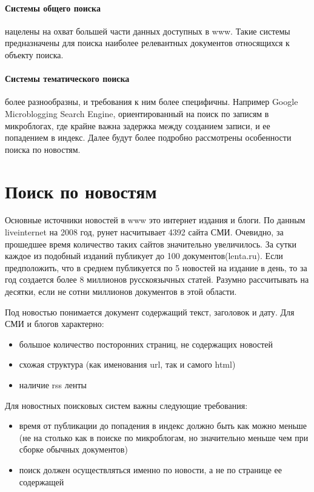 \paragraph{Системы общего поиска} нацелены на охват большей части данных доступных в www. Такие системы предназначены для поиска наиболее релевантных документов относящихся к объекту поиска.
\paragraph{Системы тематического поиска} более разнообразны, и требования к ним более специфичны. Например Google Microblogging Search Engine, ориентированный на поиск по записям в микроблогах, где крайне важна задержка между созданием записи, и ее попадением в индекс. Далее будут более подробно рассмотрены особенности поиска по новостям.

\section{Поиск по новостям}

Основные источники новостей в www это интернет издания и блоги. По данным liveinternet на 2008 год, рунет насчитывает 4392 сайта СМИ. Очевидно, за прошедшее время количество таких сайтов значительно увеличилось. За сутки каждое из подобный изданий публикует до 100 документов(lenta.ru). Если предположить, что в среднем публикуется по 5 новостей на издание в день, то за год создается более 8 миллионов русскоязычных статей. Разумно рассчитывать на десятки, если не сотни миллионов документов в этой области.

Под новостью понимается документ содержащий текст, заголовок и дату. Для СМИ и блогов характерно:
\begin{itemize}
 \item большое количество посторонних страниц, не содержащих новостей
 \item схожая структура (как именования url, так и самого html)
 \item наличие rss ленты
\end{itemize}


Для новостных поисковых систем важны следующие требования:
\begin{itemize}
 \item время от публикации до попадения в индекс должно быть как можно меньше (не на столько как в поиске по микроблогам, но значительно меньше чем при сборке обычных документов)
 \item поиск должен осуществляться именно по новости, а не по странице ее содержащей
\end{itemize}

